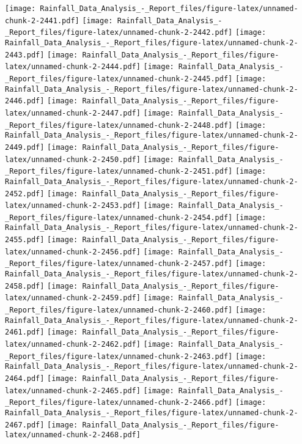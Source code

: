 \documentclass[
]{article}
\begin{document}
\texttt{[image: Rainfall\_Data\_Analysis\_-\_Report\_files/figure-latex/unnamed-chunk-2-2441.pdf]}
\texttt{[image: Rainfall\_Data\_Analysis\_-\_Report\_files/figure-latex/unnamed-chunk-2-2442.pdf]}
\texttt{[image: Rainfall\_Data\_Analysis\_-\_Report\_files/figure-latex/unnamed-chunk-2-2443.pdf]}
\texttt{[image: Rainfall\_Data\_Analysis\_-\_Report\_files/figure-latex/unnamed-chunk-2-2444.pdf]}
\texttt{[image: Rainfall\_Data\_Analysis\_-\_Report\_files/figure-latex/unnamed-chunk-2-2445.pdf]}
\texttt{[image: Rainfall\_Data\_Analysis\_-\_Report\_files/figure-latex/unnamed-chunk-2-2446.pdf]}
\texttt{[image: Rainfall\_Data\_Analysis\_-\_Report\_files/figure-latex/unnamed-chunk-2-2447.pdf]}
\texttt{[image: Rainfall\_Data\_Analysis\_-\_Report\_files/figure-latex/unnamed-chunk-2-2448.pdf]}
\texttt{[image: Rainfall\_Data\_Analysis\_-\_Report\_files/figure-latex/unnamed-chunk-2-2449.pdf]}
\texttt{[image: Rainfall\_Data\_Analysis\_-\_Report\_files/figure-latex/unnamed-chunk-2-2450.pdf]}
\texttt{[image: Rainfall\_Data\_Analysis\_-\_Report\_files/figure-latex/unnamed-chunk-2-2451.pdf]}
\texttt{[image: Rainfall\_Data\_Analysis\_-\_Report\_files/figure-latex/unnamed-chunk-2-2452.pdf]}
\texttt{[image: Rainfall\_Data\_Analysis\_-\_Report\_files/figure-latex/unnamed-chunk-2-2453.pdf]}
\texttt{[image: Rainfall\_Data\_Analysis\_-\_Report\_files/figure-latex/unnamed-chunk-2-2454.pdf]}
\texttt{[image: Rainfall\_Data\_Analysis\_-\_Report\_files/figure-latex/unnamed-chunk-2-2455.pdf]}
\texttt{[image: Rainfall\_Data\_Analysis\_-\_Report\_files/figure-latex/unnamed-chunk-2-2456.pdf]}
\texttt{[image: Rainfall\_Data\_Analysis\_-\_Report\_files/figure-latex/unnamed-chunk-2-2457.pdf]}
\texttt{[image: Rainfall\_Data\_Analysis\_-\_Report\_files/figure-latex/unnamed-chunk-2-2458.pdf]}
\texttt{[image: Rainfall\_Data\_Analysis\_-\_Report\_files/figure-latex/unnamed-chunk-2-2459.pdf]}
\texttt{[image: Rainfall\_Data\_Analysis\_-\_Report\_files/figure-latex/unnamed-chunk-2-2460.pdf]}
\texttt{[image: Rainfall\_Data\_Analysis\_-\_Report\_files/figure-latex/unnamed-chunk-2-2461.pdf]}
\texttt{[image: Rainfall\_Data\_Analysis\_-\_Report\_files/figure-latex/unnamed-chunk-2-2462.pdf]}
\texttt{[image: Rainfall\_Data\_Analysis\_-\_Report\_files/figure-latex/unnamed-chunk-2-2463.pdf]}
\texttt{[image: Rainfall\_Data\_Analysis\_-\_Report\_files/figure-latex/unnamed-chunk-2-2464.pdf]}
\texttt{[image: Rainfall\_Data\_Analysis\_-\_Report\_files/figure-latex/unnamed-chunk-2-2465.pdf]}
\texttt{[image: Rainfall\_Data\_Analysis\_-\_Report\_files/figure-latex/unnamed-chunk-2-2466.pdf]}
\texttt{[image: Rainfall\_Data\_Analysis\_-\_Report\_files/figure-latex/unnamed-chunk-2-2467.pdf]}
\texttt{[image: Rainfall\_Data\_Analysis\_-\_Report\_files/figure-latex/unnamed-chunk-2-2468.pdf]}
\end{document}
